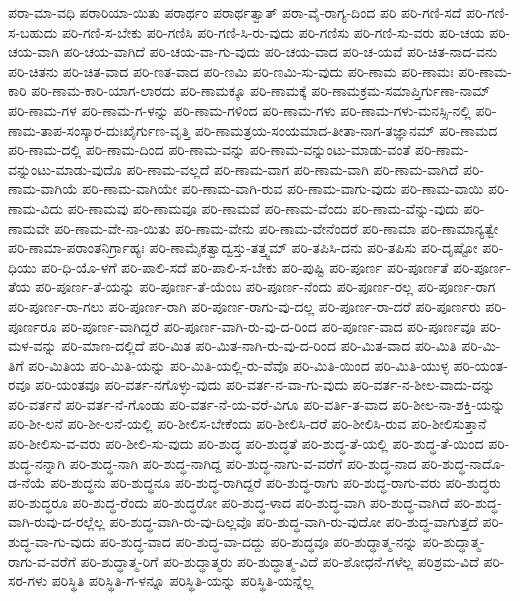 {ಪರಾ-ಮಾ-ವಧಿ
ಪರಾರಿಯಾ-ಯಿತು
ಪರಾರ್ಥಂ
ಪರಾರ್ಥತ್ವಾತ್
ಪರಾ-ವೈ-ರಾಗ್ಯ-ದಿಂದ
ಪರಿ
ಪರಿ-ಗಣಿ-ಸದೆ
ಪರಿ-ಗಣಿ-ಸ-ಬಹುದು
ಪರಿ-ಗಣಿ-ಸ-ಬೇಕು
ಪರಿ-ಗಣಿಸಿ
ಪರಿ-ಗಣಿ-ಸಿ-ರು-ವುದು
ಪರಿ-ಗಣಿಸು
ಪರಿ-ಗಣಿ-ಸು-ವರು
ಪರಿ-ಚಯ
ಪರಿ-ಚಯ-ವಾಗಿ
ಪರಿ-ಚಯ-ವಾಗಿದೆ
ಪರಿ-ಚಯ-ವಾ-ಗು-ವುದು
ಪರಿ-ಚಯ-ವಾದ
ಪರಿ-ಚ-ಯವೆ
ಪರಿ-ಚಿತ-ನಾದ-ವನು
ಪರಿ-ಚಿತನು
ಪರಿ-ಚಿತ-ವಾದ
ಪರಿ-ಣತ-ವಾದ
ಪರಿ-ಣಮಿ
ಪರಿ-ಣಮಿ-ಸು-ವುದು
ಪರಿ-ಣಾಮ
ಪರಿ-ಣಾಮಃ
ಪರಿ-ಣಾಮ-ಕಾರಿ
ಪರಿ-ಣಾಮ-ಕಾರಿ-ಯಾಗ-ಲಾರದು
ಪರಿ-ಣಾಮಕ್ಕೂ
ಪರಿ-ಣಾಮಕ್ಕೆ
ಪರಿ-ಣಾಮಕ್ರಮ-ಸಮಾಪ್ತಿರ್ಗುಣಾ-ನಾಮ್
ಪರಿ-ಣಾಮ-ಗಳ
ಪರಿ-ಣಾಮ-ಗ-ಳನ್ನು
ಪರಿ-ಣಾಮ-ಗಳಿಂದ
ಪರಿ-ಣಾಮ-ಗಳು
ಪರಿ-ಣಾಮ-ಗಳು-ಮನಸ್ಸಿ-ನಲ್ಲಿ
ಪರಿ-ಣಾಮ-ತಾಪ-ಸಂಸ್ಕಾರ-ದುಃಖೈರ್ಗುಣ-ವೃತ್ತಿ
ಪರಿ-ಣಾಮತ್ರಯ-ಸಂಯಮಾದ-ತೀತಾ-ನಾಗ-ತಜ್ಞಾನಮ್
ಪರಿ-ಣಾಮದ
ಪರಿ-ಣಾಮ-ದಲ್ಲಿ
ಪರಿ-ಣಾಮ-ದಿಂದ
ಪರಿ-ಣಾಮ-ವನ್ನು
ಪರಿ-ಣಾಮ-ವನ್ನುಂಟು-ಮಾಡು-ವಂತೆ
ಪರಿ-ಣಾಮ-ವನ್ನುಂಟು-ಮಾಡು-ವುದೊ
ಪರಿ-ಣಾಮ-ವಲ್ಲದೆ
ಪರಿ-ಣಾಮ-ವಾಗ
ಪರಿ-ಣಾಮ-ವಾಗಿ
ಪರಿ-ಣಾಮ-ವಾಗಿದೆ
ಪರಿ-ಣಾಮ-ವಾಗಿಯೆ
ಪರಿ-ಣಾಮ-ವಾಗಿಯೇ
ಪರಿ-ಣಾಮ-ವಾಗಿ-ರುವ
ಪರಿ-ಣಾಮ-ವಾಗು-ವುದು
ಪರಿ-ಣಾಮ-ವಾಯಿ
ಪರಿ-ಣಾಮ-ವಿದು
ಪರಿ-ಣಾಮವು
ಪರಿ-ಣಾಮವೂ
ಪರಿ-ಣಾಮವೆ
ಪರಿ-ಣಾಮ-ವೆಂದು
ಪರಿ-ಣಾಮ-ವೆನ್ನು-ವುದು
ಪರಿ-ಣಾಮವೇ
ಪರಿ-ಣಾಮ-ವೇ-ನಾ-ಯಿತು
ಪರಿ-ಣಾಮ-ವೇನು
ಪರಿ-ಣಾಮ-ವೇನೆಂದರೆ
ಪರಿ-ಣಾಮಾ
ಪರಿ-ಣಾಮಾನ್ಯತ್ವೇ
ಪರಿ-ಣಾಮಾ-ಪರಾಂತನಿರ್ಗ್ರಾಹ್ಯಃ
ಪರಿ-ಣಾಮೈಕತ್ವಾದ್ವಸ್ತು-ತತ್ತ್ವಮ್
ಪರಿ-ತಪಿಸಿ-ದನು
ಪರಿ-ತಪಿಸು
ಪರಿ-ದೃಷ್ಟೋ
ಪರಿ-ಧಿಯು
ಪರಿ-ಧಿ-ಯೊ-ಳಗೆ
ಪರಿ-ಪಾಲಿ-ಸದೆ
ಪರಿ-ಪಾಲಿ-ಸ-ಬೇಕು
ಪರಿ-ಪುಷ್ಟಿ
ಪರಿ-ಪೂರ್ಣ
ಪರಿ-ಪೂರ್ಣತೆ
ಪರಿ-ಪೂರ್ಣ-ತೆಯ
ಪರಿ-ಪೂರ್ಣ-ತೆ-ಯನ್ನು
ಪರಿ-ಪೂರ್ಣ-ತೆ-ಯೆಂಬ
ಪರಿ-ಪೂರ್ಣ-ನೆಂದು
ಪರಿ-ಪೂರ್ಣ-ರಲ್ಲ
ಪರಿ-ಪೂರ್ಣ-ರಾಗ
ಪರಿ-ಪೂರ್ಣ-ರಾ-ಗಲು
ಪರಿ-ಪೂರ್ಣ-ರಾಗಿ
ಪರಿ-ಪೂರ್ಣ-ರಾಗು-ವು-ದಲ್ಲ
ಪರಿ-ಪೂರ್ಣ-ರಾ-ದರೆ
ಪರಿ-ಪೂರ್ಣರು
ಪರಿ-ಪೂರ್ಣರೂ
ಪರಿ-ಪೂರ್ಣ-ವಾಗಿದ್ದರೆ
ಪರಿ-ಪೂರ್ಣ-ವಾಗಿ-ರು-ವು-ದ-ರಿಂದ
ಪರಿ-ಪೂರ್ಣ-ವಾದ
ಪರಿ-ಪೂರ್ಣವೂ
ಪರಿ-ಮಳ-ವನ್ನು
ಪರಿ-ಮಾಣ-ದಲ್ಲಿದೆ
ಪರಿ-ಮಿತ
ಪರಿ-ಮಿತ-ನಾಗಿ-ರು-ವು-ದ-ರಿಂದ
ಪರಿ-ಮಿತ-ವಾದ
ಪರಿ-ಮಿತಿ
ಪರಿ-ಮಿ-ತಿಗೆ
ಪರಿ-ಮಿತಿಯ
ಪರಿ-ಮಿತಿ-ಯನ್ನು
ಪರಿ-ಮಿತಿ-ಯಲ್ಲಿ-ರು-ವೆವೊ
ಪರಿ-ಮಿತಿ-ಯಿಂದ
ಪರಿ-ಮಿತಿ-ಯುಳ್ಳ
ಪರಿ-ಯಂತ-ರವೂ
ಪರಿ-ಯಂತವೂ
ಪರಿ-ವರ್ತ-ನಗೊಳ್ಳು-ವುದು
ಪರಿ-ವರ್ತ-ನ-ವಾ-ಗು-ವುದು
ಪರಿ-ವರ್ತ-ನ-ಶೀಲ-ವಾದು-ದನ್ನು
ಪರಿ-ವರ್ತನೆ
ಪರಿ-ವರ್ತ-ನೆ-ಗೊಂಡು
ಪರಿ-ವರ್ತ-ನೆ-ಯ-ವರೆ-ವಿಗೂ
ಪರಿ-ವರ್ತಿ-ತ-ವಾದ
ಪರಿ-ಶೀಲ-ನಾ-ಶಕ್ತಿ-ಯನ್ನು
ಪರಿ-ಶೀ-ಲನೆ
ಪರಿ-ಶೀ-ಲನೆ-ಯಲ್ಲಿ
ಪರಿ-ಶೀಲಿಸ-ಬೇಕೆಂದು
ಪರಿ-ಶೀಲಿಸಿ-ದರೆ
ಪರಿ-ಶೀಲಿಸಿ-ರುವ
ಪರಿ-ಶೀಲಿಸುತ್ತಾನೆ
ಪರಿ-ಶೀಲಿಸು-ವ-ವರು
ಪರಿ-ಶೀಲಿ-ಸು-ವುದು
ಪರಿ-ಶುದ್ಧ
ಪರಿ-ಶುದ್ಧತೆ
ಪರಿ-ಶುದ್ಧ-ತೆ-ಯಲ್ಲಿ
ಪರಿ-ಶುದ್ಧ-ತೆ-ಯಿಂದ
ಪರಿ-ಶುದ್ಧ-ನನ್ನಾಗಿ
ಪರಿ-ಶುದ್ಧ-ನಾಗಿ
ಪರಿ-ಶುದ್ಧ-ನಾಗಿದ್ದ
ಪರಿ-ಶುದ್ಧ-ನಾಗು-ವ-ವರೆಗೆ
ಪರಿ-ಶುದ್ಧ-ನಾದ
ಪರಿ-ಶುದ್ಧ-ನಾದೊ-ಡ-ನೆಯೆ
ಪರಿ-ಶುದ್ಧನು
ಪರಿ-ಶುದ್ಧನೂ
ಪರಿ-ಶುದ್ಧ-ರಾಗಿದ್ದರೆ
ಪರಿ-ಶುದ್ಧ-ರಾಗು
ಪರಿ-ಶುದ್ಧ-ರಾಗು-ವರು
ಪರಿ-ಶುದ್ಧರು
ಪರಿ-ಶುದ್ಧರೂ
ಪರಿ-ಶುದ್ಧ-ರೆಂದು
ಪರಿ-ಶುದ್ಧರೋ
ಪರಿ-ಶುದ್ಧ-ಳಾದ
ಪರಿ-ಶುದ್ಧ-ವಾಗಿ
ಪರಿ-ಶುದ್ಧ-ವಾಗಿದೆ
ಪರಿ-ಶುದ್ಧ-ವಾಗಿ-ರುವು-ದ-ರಲ್ಲೆಲ್ಲ
ಪರಿ-ಶುದ್ಧ-ವಾಗಿ-ರು-ವು-ದಿಲ್ಲವೊ
ಪರಿ-ಶುದ್ಧ-ವಾಗಿ-ರು-ವುದೋ
ಪರಿ-ಶುದ್ಧ-ವಾಗುತ್ತದೆ
ಪರಿ-ಶುದ್ಧ-ವಾ-ಗು-ವುದು
ಪರಿ-ಶುದ್ಧ-ವಾದ
ಪರಿ-ಶುದ್ಧ-ವಾ-ದದ್ದು
ಪರಿ-ಶುದ್ಧವೂ
ಪರಿ-ಶುದ್ಧಾತ್ಮ-ನನ್ನು
ಪರಿ-ಶುದ್ಧಾತ್ಮ-ರಾಗು-ವ-ವರೆಗೆ
ಪರಿ-ಶುದ್ಧಾತ್ಮ-ರಿಗೆ
ಪರಿ-ಶುದ್ಧಾತ್ಮರು
ಪರಿ-ಶುದ್ಧಾತ್ಮ-ವಿದೆ
ಪರಿ-ಶೋಧನೆ-ಗಳೆಲ್ಲ
ಪರಿಶ್ರಮ-ವಿದೆ
ಪರಿ-ಸರ-ಗಳು
ಪರಿಸ್ಥಿತಿ
ಪರಿಸ್ಥಿತಿ-ಗ-ಳನ್ನೂ
ಪರಿಸ್ಥಿತಿ-ಯನ್ನು
ಪರಿಸ್ಥಿತಿ-ಯನ್ನೆಲ್ಲ
}
